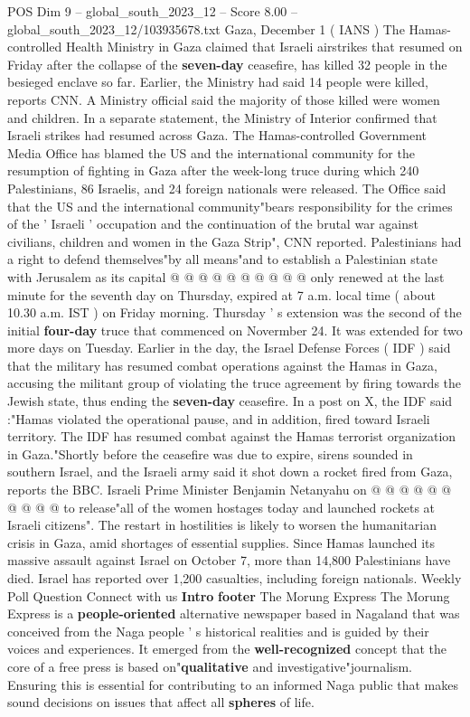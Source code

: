 \begin{textsample}{POS Dim 9 – global\_south\_2023\_12 – Score 8.00 – global\_south\_2023\_12/103935678.txt}  \label{ex:f9_pos_001}
Gaza, December 1 ( IANS ) The Hamas-controlled Health Ministry in Gaza claimed that Israeli airstrikes that resumed on Friday after the collapse of the \textbf{seven-day} ceasefire, has killed 32 people in the besieged enclave so far.
Earlier, the Ministry had said 14 people were killed, reports CNN.
A Ministry official said the majority of those killed were women and children.
In a separate statement, the Ministry of Interior confirmed that Israeli strikes had resumed across Gaza.
The Hamas-controlled Government Media Office has blamed the US and the international community for the resumption of fighting in Gaza after the week-long truce during which 240 Palestinians, 86 Israelis, and 24 foreign nationals were released.
The Office said that the US and the international community"bears responsibility for the crimes of the ' Israeli ' occupation and the continuation of the brutal war against civilians, children and women in the Gaza Strip", CNN reported.
Palestinians had a right to defend themselves"by all means"and to establish a Palestinian state with Jerusalem as its capital @ @ @ @ @ @ @ @ @ @ only renewed at the last minute for the seventh day on Thursday, expired at 7 a.m. local time ( about 10.30 a.m.
IST ) on Friday morning.
Thursday ' s extension was the second of the initial \textbf{four-day} truce that commenced on Novermber 24.
It was extended for two more days on Tuesday.
Earlier in the day, the Israel Defense Forces ( IDF ) said that the military has resumed combat operations against the Hamas in Gaza, accusing the militant group of violating the truce agreement by firing towards the Jewish state, thus ending the \textbf{seven-day} ceasefire.
In a post on X, the IDF said :"Hamas violated the operational pause, and in addition, fired toward Israeli territory.
The IDF has resumed combat against the Hamas terrorist organization in Gaza."Shortly before the ceasefire was due to expire, sirens sounded in southern Israel, and the Israeli army said it shot down a rocket fired from Gaza, reports the BBC.
Israeli Prime Minister Benjamin Netanyahu on @ @ @ @ @ @ @ @ @ @ to release"all of the women hostages today and launched rockets at Israeli citizens".
The restart in hostilities is likely to worsen the humanitarian crisis in Gaza, amid shortages of essential supplies.
Since Hamas launched its massive assault against Israel on October 7, more than 14,800 Palestinians have died.
Israel has reported over 1,200 casualties, including foreign nationals.
Weekly Poll Question Connect with us \textbf{Intro} \textbf{footer} The Morung Express The Morung Express is a \textbf{people-oriented} alternative newspaper based in Nagaland that was conceived from the Naga people ' s historical realities and is guided by their voices and experiences.
It emerged from the \textbf{well-recognized} concept that the core of a free press is based on"\textbf{qualitative} and investigative"journalism.
Ensuring this is essential for contributing to an informed Naga public that makes sound decisions on issues that affect all \textbf{spheres} of life.

\end{textsample}
